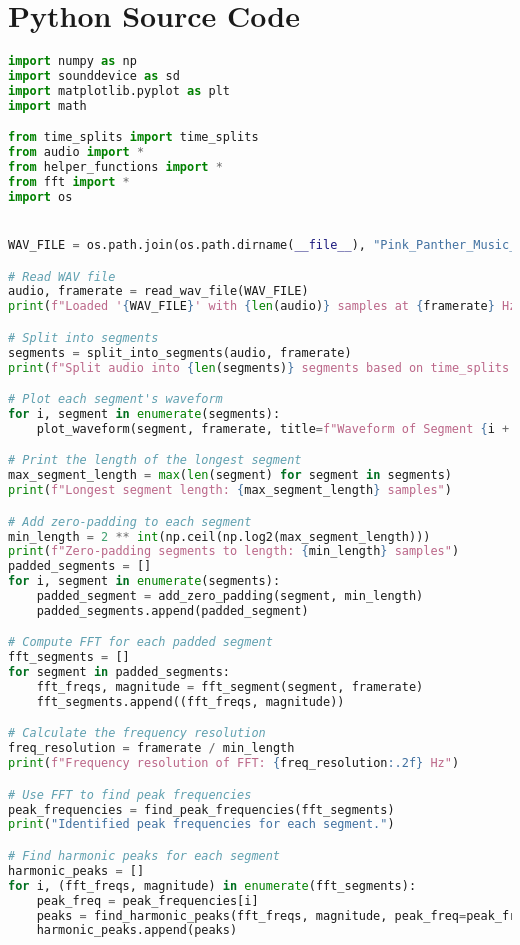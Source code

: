 \chapter{Python Source Code}

\begin{lstlisting}[language=Python, caption={main.py}, label={lst:main}]
import numpy as np
import sounddevice as sd
import matplotlib.pyplot as plt
import math

from time_splits import time_splits
from audio import *
from helper_functions import *
from fft import *
import os


WAV_FILE = os.path.join(os.path.dirname(__file__), "Pink_Panther_Music_Box.wav")

# Read WAV file
audio, framerate = read_wav_file(WAV_FILE)
print(f"Loaded '{WAV_FILE}' with {len(audio)} samples at {framerate} Hz")

# Split into segments
segments = split_into_segments(audio, framerate)
print(f"Split audio into {len(segments)} segments based on time_splits.")

# Plot each segment's waveform
for i, segment in enumerate(segments):
    plot_waveform(segment, framerate, title=f"Waveform of Segment {i + 1}", index=i + 1)

# Print the length of the longest segment
max_segment_length = max(len(segment) for segment in segments)
print(f"Longest segment length: {max_segment_length} samples")

# Add zero-padding to each segment
min_length = 2 ** int(np.ceil(np.log2(max_segment_length)))
print(f"Zero-padding segments to length: {min_length} samples")
padded_segments = []
for i, segment in enumerate(segments):
    padded_segment = add_zero_padding(segment, min_length)
    padded_segments.append(padded_segment)

# Compute FFT for each padded segment
fft_segments = []
for segment in padded_segments:
    fft_freqs, magnitude = fft_segment(segment, framerate)
    fft_segments.append((fft_freqs, magnitude))

# Calculate the frequency resolution
freq_resolution = framerate / min_length
print(f"Frequency resolution of FFT: {freq_resolution:.2f} Hz")

# Use FFT to find peak frequencies
peak_frequencies = find_peak_frequencies(fft_segments)
print("Identified peak frequencies for each segment.")

# Find harmonic peaks for each segment
harmonic_peaks = []
for i, (fft_freqs, magnitude) in enumerate(fft_segments):
    peak_freq = peak_frequencies[i]
    peaks = find_harmonic_peaks(fft_freqs, magnitude, peak_freq=peak_freq)
    harmonic_peaks.append(peaks)


\end{lstlisting}

